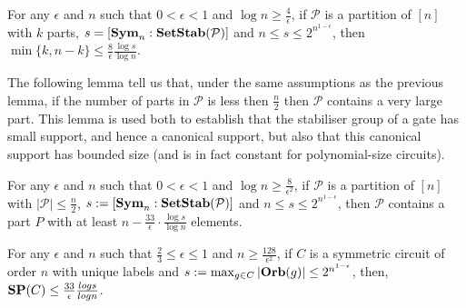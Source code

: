 \documentclass[../paper.tex]{subfiles}
\begin{document}
\begin{lem}
  \label{lem:big-or-small}
  For any $\epsilon$ and $n$ such that $0 < \epsilon < 1$ and $\log n \geq
  \frac{4}{\epsilon}$, if $\mathcal{P}$ is a partition of $[n]$ with $k$ parts,
  $s = [\text{\textbf{Sym}}_n : \text{\textbf{SetStab}} (\mathcal{P})]$ and $n \leq s \leq
  2^{n^{1-\epsilon}}$, then $\min \{k, n-k\} \leq \frac{8}{\epsilon} \frac{\log
    s}{\log n}$.
\end{lem}

The following lemma tell us that, under the same assumptions as the previous
lemma, if the number of parts in $\mathcal{P}$ is less then $\frac{n}{2}$ then
$\mathcal{P}$ contains a very large part. This lemma is used both to establish
that the stabiliser group of a gate has small support, and hence a canonical
support, but also that this canonical support has bounded size (and is in fact
constant for polynomial-size circuits).

\begin{lem}
  \label{lem:small-means-support}
  For any $\epsilon$ and $n$ such that $0 < \epsilon < 1$ and $\log n \geq
  \frac{8}{\epsilon^2}$, if $\mathcal{P}$ is a partition of $[n]$ with $\vert
  \mathcal{P} \vert \leq \frac{n}{2}$, $s:= [\text{\textbf{Sym}}_n : \text{\textbf{SetStab}} (\mathcal{P})]$
  and $n \leq s \leq 2^{n^{1-\epsilon}}$, then $\mathcal{P}$ contains a part $P$
  with at least $n - \frac{33}{\epsilon} \cdot \frac{\log s} {\log n}$ elements.
\end{lem}


\begin{thm}
  \label{thm:support_thm}
  For any $\epsilon$ and $n$ such that $\frac{2}{3} \leq \epsilon \leq 1$ and $n
  \geq \frac{128}{\epsilon^2}$, if $C$ is a symmetric circuit of order $n$ with
  unique labels and $s := \max_{g \in C} \vert \text{\textbf{Orb}} (g)\vert \leq
  2^{n^{1-\epsilon}}$, then, $\text{\textbf{SP}}(C) \leq \frac{33}{\epsilon}\frac{log s}{log
    n}$.
\end{thm}
\end{document}

